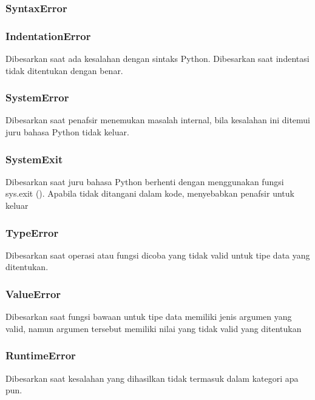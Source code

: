 \subsubsection{SyntaxError} 

\subsubsection{IndentationError}
Dibesarkan saat ada kesalahan dengan sintaks Python.
Dibesarkan saat indentasi tidak ditentukan dengan benar. 

\subsubsection{SystemError} 
Dibesarkan saat penafsir menemukan masalah internal, bila kesalahan ini ditemui juru bahasa Python tidak keluar.
\subsubsection{SystemExit} 
Dibesarkan saat juru bahasa Python berhenti dengan menggunakan fungsi sys.exit (). Apabila tidak ditangani dalam kode, menyebabkan penafsir untuk keluar

\subsubsection{TypeError} 
Dibesarkan saat operasi atau fungsi dicoba yang tidak valid untuk tipe data yang ditentukan.
\subsubsection{ValueError}
Dibesarkan saat fungsi bawaan untuk tipe data memiliki jenis argumen yang valid, namun argumen tersebut memiliki nilai yang tidak valid yang ditentukan

\subsubsection{RuntimeError} 
Dibesarkan saat kesalahan yang dihasilkan tidak termasuk dalam kategori apa pun.

